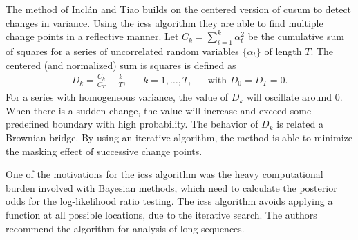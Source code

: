 The method of Incl\'{a}n and Tiao \cite{inclan1994use} builds on the centered version of \gls{cusum} \cite{brown1975techniques} to detect changes in variance.
Using the \gls{icss} algorithm they are able to find multiple change points in a reflective manner.
Let $C_k = \sum_{i=1}^k \alpha_t^2$ be the cumulative sum of squares for a series of uncorrelated random variables $\{\alpha_t\}$ of length $T$.
The centered (and normalized) sum is squares is defined as
\begin{equation}
  \begin{aligned}
  D_k = \frac{C_k}{C_T} - \frac{k}{T}, & & k = 1, \dots, T, & & \text{with } D_0 = D_T = 0.
  \end{aligned}
\end{equation}
For a series with homogeneous variance, the value of $D_k$ will oscillate around $0$.
When there is a sudden change, the value will increase and exceed some predefined boundary with high probability.
The behavior of $D_k$ is related a Brownian bridge.
By using an iterative algorithm, the method is able to minimize the masking effect of successive change points.

One of the motivations for the \gls{icss} algorithm was the heavy computational burden involved with Bayesian methods, which need to calculate the posterior odds for the log-likelihood ratio testing.
The \gls{icss} algorithm avoids applying a function at all possible locations, due to the iterative search.
The authors recommend the algorithm for analysis of long sequences.